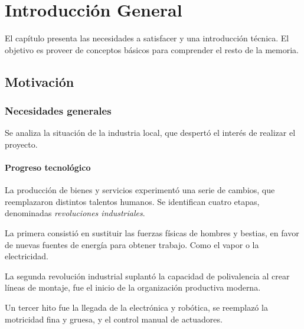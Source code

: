 \chapter{Introducción General}

\label{Chapter1} %
\label{IntroGeneral}


\newcommand{\keyword}[1]{\textbf{#1}}
\newcommand{\tabhead}[1]{\textbf{#1}}
\newcommand{\code}[1]{\texttt{#1}}
\newcommand{\file}[1]{\texttt{\bfseries#1}}
\newcommand{\option}[1]{\texttt{\itshape#1}}
\newcommand{\grados}{$^{\circ}$}


El capítulo presenta las necesidades a satisfacer y una introducción técnica. El objetivo es proveer de conceptos básicos para comprender el resto de la memoria.

\section{Motivación}
\label{motivacion}

	\subsection{Necesidades generales}
	
		Se analiza la situación de la industria local, que despertó el interés de realizar el proyecto.

		\subsubsection{Progreso tecnológico}

			La producción de bienes y servicios experimentó una serie de cambios, que reemplazaron distintos talentos humanos. Se identifican cuatro etapas, denominadas \emph{revoluciones industriales}.
		
			La primera consistió en sustituir las fuerzas físicas de hombres y bestias, en favor de nuevas fuentes de energía para obtener trabajo. Como el vapor o la electricidad. 

			La segunda revolución industrial suplantó la capacidad de polivalencia al crear líneas de montaje, fue el inicio de la organización productiva moderna.

			Un tercer hito fue la llegada de la electrónica y robótica, se reemplazó la motricidad fina y gruesa, y el control manual de actuadores. 


